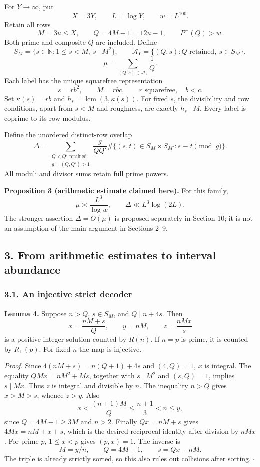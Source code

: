 \documentclass[
  english,
  11pt,
]{article}
\begin{document}
For \(Y\to\infty\), put \[
X=3Y,\qquad L=\log Y,\qquad w=L^{100}.
\] Retain all rows \[
M=3u\le X,\qquad Q=4M-1=12u-1,\qquad P^-(Q)>w.
\] Both prime and composite \(Q\) are included. Define \[
S_M=\{s\in\mathbb N:1\le s<M,\ s\mid M^2\},\qquad
\mathcal A_Y=\{(Q,s):Q\text{ retained},\ s\in S_M\},
\] \[
\mu=\sum_{(Q,s)\in\mathcal A_Y}\frac1Q.
\] Each label has the unique squarefree representation \[
s=rb^2,\qquad M=rbc,\qquad r\text{ squarefree},\quad b<c.
\] Set \(\kappa(s)=rb\) and \(h_s=\operatorname{lcm}(3,\kappa(s))\). For
fixed \(s\), the divisibility and row conditions, apart from \(s<M\) and
roughness, are exactly \(h_s\mid M\). Every label is coprime to its row
modulus.

Define the unordered distinct-row overlap \[
\Delta=\sum_{\substack{Q<Q'\text{ retained}\\g=(Q,Q')>1}}
\frac{g}{QQ'}
\#\{(s,t)\in S_M\times S_{M'}:s\equiv t\pmod g\}. \tag{4}
\] All moduli and divisor sums retain full prime powers.

\textbf{Proposition 3 (arithmetic estimate claimed here).} For this
family, \[
\mu\asymp\frac{L^3}{\log w},\qquad
\Delta\ll L^3\log(2L). \tag{5}
\] The stronger assertion \(\Delta=O(\mu)\) is proposed separately in
Section 10; it is not an assumption of the main argument in Sections
2--9.

\subsection{3. From arithmetic estimates to interval
abundance}\label{from-arithmetic-estimates-to-interval-abundance}

\subsubsection{3.1. An injective strict
decoder}\label{an-injective-strict-decoder}

\textbf{Lemma 4.} Suppose \(n>Q\), \(s\in S_M\), and \(Q\mid n+4s\).
Then \[
x=\frac{nM+s}{Q},\qquad y=nM,\qquad z=\frac{nMx}{s} \tag{6}
\] is a positive integer solution counted by \(R(n)\). If \(n=p\) is
prime, it is counted by \(R_{\mathrm{II}}(p)\). For fixed \(n\) the map
is injective.

\emph{Proof.} Since \(4(nM+s)=n(Q+1)+4s\) and \((4,Q)=1\), \(x\) is
integral. The equality \(QMx=nM^2+Ms\), together with \(s\mid M^2\) and
\((s,Q)=1\), implies \(s\mid Mx\). Thus \(z\) is integral and divisible
by \(n\). The inequality \(n>Q\) gives \(x>M>s\), whence \(z>y\). Also
\[
x<\frac{(n+1)M}{Q}\le\frac{n+1}{3}<n\le y,
\] since \(Q=4M-1\ge3M\) and \(n>2\). Finally \(Qx=nM+s\) gives
\(4Mx=nM+x+s\), which is the desired reciprocal identity after division
by \(nMx\). For prime \(p\), \(1\le x<p\) gives \((p,x)=1\). The inverse
is \[
M=y/n,\qquad Q=4M-1,\qquad s=Qx-nM. \tag{7}
\] The triple is already strictly sorted, so this also rules out
collisions after sorting. \(\square\)
\end{document}
